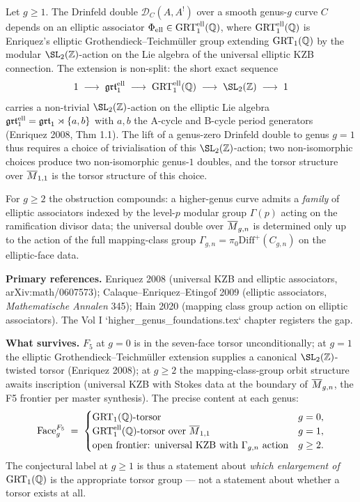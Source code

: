 \begin{theorem}[Obstruction to $F_5$ at $g \ge 1$]\ClaimStatusScoped
\label{thm:f5-obstruction}
Let $g \ge 1$. The Drinfeld double $\mathcal{D}_C(A, A^!)$ over a
smooth genus-$g$ curve $C$ depends on an elliptic associator
$\Phi_{\mathrm{ell}} \in \mathrm{GRT}_1^{\mathrm{ell}}(\mathbb{Q})$, where
$\mathrm{GRT}_1^{\mathrm{ell}}(\mathbb{Q})$ is Enriquez's elliptic
Grothendieck--Teichm\"uller group extending $\mathrm{GRT}_1(\mathbb{Q})$ by the modular
$\SL_2(\ZZ)$-action on the Lie algebra of the universal elliptic KZB
connection. The extension is non-split: the short exact sequence
\[
  1 \;\longrightarrow\; \grt^{\mathrm{ell}} \;\longrightarrow\;
  \GRT^{\mathrm{ell}}(\QQ) \;\longrightarrow\;
  \SL_2(\ZZ) \;\longrightarrow\; 1
\]
carries a non-trivial $\SL_2(\ZZ)$-action on the elliptic Lie algebra
$\mathfrak{grt}_1^{\mathrm{ell}} = \mathfrak{grt}_1 \rtimes \{a, b\}$ with $a, b$ the
A-cycle and B-cycle period generators (Enriquez 2008, Thm 1.1).
The lift of a genus-zero Drinfeld double to genus $g = 1$ thus
requires a choice of trivialisation of this $\SL_2(\ZZ)$-action; two
non-isomorphic choices produce two non-isomorphic genus-$1$ doubles,
and the torsor structure over $\overline{M}_{1,1}$ is the torsor structure
of this choice.

For $g \ge 2$ the obstruction compounds: a higher-genus curve admits
a \emph{family} of elliptic associators indexed by the level-$p$
modular group $\Gamma(p)$ acting on the ramification divisor data;
the universal double over $\overline{M}_{g,n}$ is determined only up to
the action of the full mapping-class group
$\Gamma_{g,n} = \pi_0 \mathrm{Diff}^+(C_{g,n})$ on the elliptic-face
data.
\end{theorem}

\textbf{Primary references.} Enriquez 2008 (universal KZB and elliptic
associators, arXiv:math/0607573); Calaque--Enriquez--Etingof 2009
(elliptic associators, \emph{Mathematische Annalen} 345); Hain 2020
(mapping class group action on elliptic associators). The Vol I
`higher\_genus\_foundations.tex` chapter registers the gap.

\textbf{What survives.} $F_5$ at $g = 0$ is in the seven-face torsor
unconditionally; at $g = 1$ the elliptic Grothendieck--Teichm\"uller
extension supplies a canonical $\SL_2(\ZZ)$-twisted torsor
(Enriquez 2008); at $g \ge 2$ the mapping-class-group orbit structure
awaits inscription (universal KZB with Stokes data at the boundary of
$\overline{M}_{g,n}$, the F5 frontier per master synthesis). The precise
content at each genus:
\[
  \mathrm{Face}^{F_5}_g \;=\; \begin{cases}
    \text{$\mathrm{GRT}_1(\mathbb{Q})$-torsor} & g = 0, \\
    \text{$\mathrm{GRT}_1^{\mathrm{ell}}(\mathbb{Q})$-torsor over $\overline{M}_{1,1}$} & g = 1, \\
    \text{open frontier: universal KZB with $\Gamma_{g,n}$ action} & g \ge 2.
  \end{cases}
\]
The conjectural label at $g \ge 1$ is thus a statement about
\emph{which enlargement of $\mathrm{GRT}_1(\mathbb{Q})$} is the appropriate torsor
group --- not a statement about whether a torsor exists at all.

